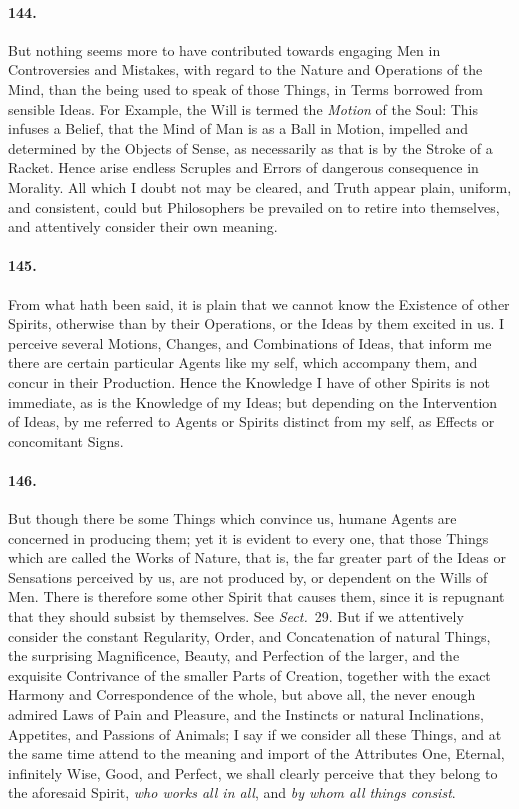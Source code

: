 \documentclass[]{article}
\newenvironment{sectionbody}{}{}
\begin{document}
\begin{sectionbody}
\paragraph{144.} But nothing seems more to have contributed towards engaging Men
in Controversies and Mistakes, with regard to the Nature and
Operations of the Mind, than the being used to speak of those
Things, in Terms borrowed from sensible Ideas.  For Example, the
Will is termed the \emph{Motion} of the Soul: This infuses a
Belief, that the Mind of Man is as a Ball in Motion, impelled and
determined by the Objects of Sense, as necessarily as that is by
the Stroke of a Racket.  Hence arise endless Scruples and Errors
of dangerous consequence in Morality.  All which I doubt not may
be cleared, and Truth appear plain, uniform, and consistent,
could but Philosophers be prevailed on to retire into themselves,
and attentively consider their own meaning.



\paragraph{145.} From what hath been said, it is plain that we cannot know the
Existence of other Spirits, otherwise than by their Operations,
or the Ideas by them excited in us.  I perceive several Motions,
Changes, and Combinations of Ideas, that inform me there are
certain particular Agents like my self, which accompany them, and
concur in their Production.  Hence the Knowledge I have of other
Spirits is not immediate, as is the Knowledge of my Ideas; but
depending on the Intervention of Ideas, by me referred to Agents
or Spirits distinct from my self, as Effects or concomitant
Signs.



\paragraph{146.} But though there be some Things which convince us, humane Agents
are concerned in producing them; yet it is evident to every one,
that those Things which are called the Works of Nature, that is,
the far greater part of the Ideas or Sensations perceived by us,
are not produced by, or dependent on the Wills of Men.  There is
therefore some other Spirit that causes them, since it is
repugnant that they should subsist by themselves.  See
\emph{Sect.}~29.
But if we attentively consider the constant Regularity, Order,
and Concatenation of natural Things, the surprising Magnificence,
Beauty, and Perfection of the larger, and the exquisite
Contrivance of the smaller Parts of Creation, together with the
exact Harmony and Correspondence of the whole, but above all, the
never enough admired Laws of Pain and Pleasure, and the Instincts
or natural Inclinations, Appetites, and Passions of Animals; I
say if we consider all these Things, and at the same time attend
to the meaning and import of the Attributes One, Eternal,
infinitely Wise, Good, and Perfect, we shall clearly perceive
that they belong to the aforesaid Spirit, \emph{who works all in
all}, and \emph{by whom all things consist}.




\end{sectionbody}
\end{document}
